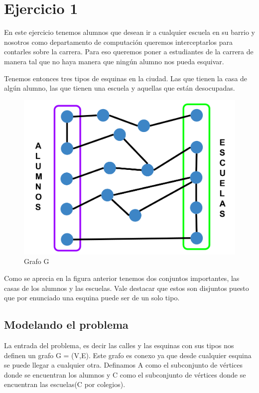 \section{Ejercicio 1}

En este ejercicio tenemos alumnos que desean ir a cualquier escuela en su barrio y nosotros como departamento de computación queremos interceptarlos para contarles sobre la carrera. Para eso queremos poner a estudiantes de la carrera de manera tal que no haya manera que ningún alumno nos pueda esquivar.

Tenemos entonces tres tipos de esquinas en la ciudad. Las que tienen la casa de algún alumno, las que tienen una escuela y aquellas que están desocupadas.

\begin{figure}[h]
  \centering
    \includegraphics[scale = 0.225]{img/esquema.png}
    \caption{Grafo G}
\end{figure}

Como se aprecia en la figura anterior tenemos dos conjuntos importantes, las casas de los alumnos y las escuelas. Vale destacar que estos son disjuntos puesto que por enunciado una esquina puede ser de un solo tipo.

\subsection{Modelando el problema}

La entrada del problema, es decir las calles y las esquinas con sus tipos nos definen un grafo G = (V,E). Este grafo es conexo ya que desde cualquier esquina se puede llegar a cualquier otra. Definamos A como el subconjunto de vértices donde se encuentran los alumnos y C como el subconjunto de vértices donde se encuentran las escuelas(C por colegios).

